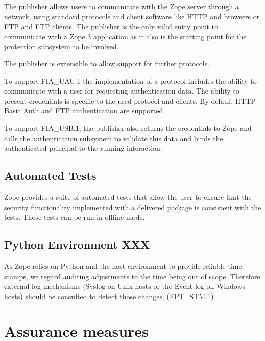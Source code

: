 \documentclass[12pt,english]{scrbook}
\begin{document}
The publisher allows users to communicate with the Zope server through a
network, using standard protocols and client software like HTTP and browsers or
FTP and FTP clients. The publisher is the only valid entry point to communicate
with a Zope 3 application as it also is the starting point for the protection
subsystem to be involved.

The publisher is extensible to allow support for further protocols.

To support FIA{\_}UAU.1 the implementation of a protocol includes the ability to
communicate with a user for requesting authentication data. The ability to
present credentials is specific to the used protocol and clients. By default
HTTP Basic Auth and FTP authentication are supported.

To support FIA{\_}USB.1, the publisher also returns the credentials to Zope and
calls the authentication subsystem to validate this data and binds the
authenticated principal to the running interaction.



\subsection{Automated Tests}

Zope provides a suite of automated tests that allow the user to ensure that the
security functionality implemented with a delivered package is consistent with
the tests. Those tests can be run in offline mode.





\subsection{Python Environment XXX}

As Zope relies on Python and the host environment to provide reliable time
stamps, we regard auditing adjustments to the time being out of scope.
Therefore external log mechanisms (Syslog on Unix hosts or the Event log on
Windows hosts) should be consulted to detect those changes. (FPT{\_}STM.1)




\section{Assurance measures}
\end{document}
